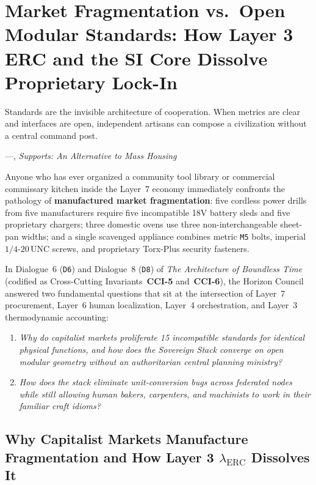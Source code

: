 \chapter{Market Fragmentation vs.\ Open Modular Standards: How Layer 3 ERC and the SI Core Dissolve Proprietary Lock-In}
\label{ch:l7-modular-standards}

\epigraph{Standards are the invisible architecture of cooperation. When metrics are clear and interfaces are open, independent artisans can compose a civilization without a central command post.}{---\textcite{habraken1972supports}, \textit{Supports: An Alternative to Mass Housing}}

Anyone who has ever organized a community tool library or commercial commissary kitchen inside the Layer~7 economy immediately confronts the pathology of \textbf{manufactured market fragmentation}: five cordless power drills from five manufacturers require five incompatible 18V battery sleds and five proprietary chargers; three domestic ovens use three non-interchangeable sheet-pan widths; and a single scavenged appliance combines metric \texttt{M5} bolts, imperial $1/4\text{-}20\,\mathrm{UNC}$ screws, and proprietary Torx-Plus security fasteners.

In Dialogue~6 (\texttt{D6}) and Dialogue~8 (\texttt{D8}) of \textit{The Architecture of Boundless Time} (codified as Cross-Cutting Invariants~\textbf{CCI-5} and~\textbf{CCI-6}), the Horizon Council answered two fundamental questions that sit at the intersection of Layer~7 procurement, Layer~6 human localization, Layer~4 orchestration, and Layer~3 thermodynamic accounting:
\begin{enumerate}
    \item \textit{Why do capitalist markets proliferate 15 incompatible standards for identical physical functions, and how does the Sovereign Stack converge on open modular geometry without an authoritarian central planning ministry?}
    \item \textit{How does the stack eliminate unit-conversion bugs across federated nodes while still allowing human bakers, carpenters, and machinists to work in their familiar craft idioms?}
\end{enumerate}

\section{Why Capitalist Markets Manufacture Fragmentation and How Layer 3 $\lambda_{\mathrm{ERC}}$ Dissolves It}
\label{sec:l7-erc-convergence}


